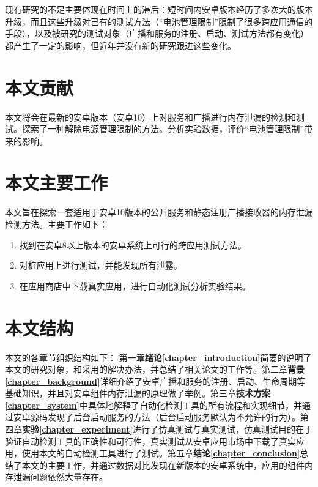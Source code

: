 现有研究的不足主要体现在时间上的滞后：短时间内安卓版本经历了多次大的版本升级，而且这些升级对已有的测试方法（“电池管理限制”限制了很多跨应用通信的手段），以及被研究的测试对象（广播和服务的注册、启动、测试方法都有变化）都产生了一定的影响，但近年并没有新的研究跟进这些变化。

\section{本文贡献}

本文将会在最新的安卓版本（安卓10）上对服务和广播进行内存泄漏的检测和测试。探索了一种解除电源管理限制的方法。分析实验数据，评价“电池管理限制”带来的影响。

\section{本文主要工作}
本文旨在探索一套适用于安卓10版本的公开服务和静态注册广播接收器的内存泄漏检测方法。主要工作如下：
\newline
\begin{enumerate}
\item 找到在安卓8以上版本的安卓系统上可行的跨应用测试方法。

\item 对桩应用上进行测试，并能发现所有泄露。

\item 在应用商店中下载真实应用，进行自动化测试分析实验结果。

\end{enumerate}
\section{本文结构}
本文的各章节组织结构如下：
第一章\textbf{绪论\ref{chapter_introduction}}简要的说明了本文的研究对象，和采用的解决办法，并总结了相关论文的工作等。第二章\textbf{背景\ref{chapter_background}}详细介绍了安卓广播和服务的注册、启动、生命周期等基础知识，并且对安卓组件内存泄漏的原理做了举例。第三章\textbf{技术方案\ref{chapter_system}}中具体地解释了自动化检测工具的所有流程和实现细节，并通过安卓源码发现了后台启动服务的方法（后台启动服务默认为不允许的行为）。第四章\textbf{实验\ref{chapter_experiment}}进行了仿真测试与真实测试，仿真测试目的在于验证自动检测工具的正确性和可行性，真实测试从安卓应用市场中下载了真实应用，使用本文的自动检测工具进行了测试。第五章\textbf{结论\ref{chapter_conclusion}}总结了本文的主要工作，并通过数据对比发现在新版本的安卓系统中，应用的组件内存泄漏问题依然大量存在。